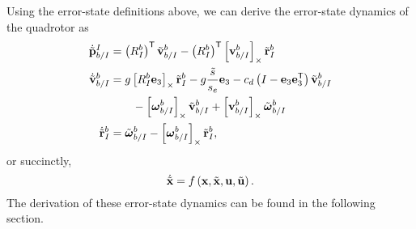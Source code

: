 Using the error-state definitions above, we can derive the error-state dynamics
of the quadrotor as
\begin{align}
        \dot{\tilde{\boldsymbol{\mathrm{p}}}}_{b/I}^{I} &= \left(R_{I}^{b}\right)^{\mathsf{T}}
          \tilde{\boldsymbol{\mathrm{v}}}_{b/I}^{b} - \left(R_{I}^{b}\right)^{\mathsf{T}}
          \left[ \boldsymbol{\mathrm{v}}_{b/I}^{b} \right]_{\times} \tilde{\boldsymbol{\mathrm{r}}}_I^b \nonumber\\
        \dot{\tilde{\boldsymbol{\mathrm{v}}}}_{b/I}^{b} &= g\left[ R_I^b
          \boldsymbol{\mathrm{e}}_3 \right]_{\times} \tilde{\boldsymbol{\mathrm{r}}}_I^b -g\frac{\tilde{s}}{s_e}\boldsymbol{\mathrm{e}}_3
          -c_d \left( I - \boldsymbol{\mathrm{e}}_3 \boldsymbol{\mathrm{e}}_3^{\mathsf{T}} \right)
          \tilde{\boldsymbol{\mathrm{v}}}_{b/I}^b \nonumber \\
                                         & \qquad - \left[ \boldsymbol{\mathrm{\omega}}_{b/I}^b \right]_{\times}
          \tilde{\boldsymbol{\mathrm{v}}}_{b/I}^b + \left[ \boldsymbol{\mathrm{v}}_{b/I}^b \right]_{\times}
          \tilde{\boldsymbol{\mathrm{\omega}}}_{b/I}^b \nonumber \\
          \dot{\tilde{\boldsymbol{\mathrm{r}}}}_{I}^{b} &= \tilde{\boldsymbol{\mathrm{\omega}}}_{b/I}^{b} -
        \left[ \boldsymbol{\mathrm{\omega}}_{b/I}^{b}  \right]_{\times} \tilde{\boldsymbol{\mathrm{r}}}_I^b,
	\label{eq:error_state_dynamics}
\end{align}
or succinctly,
\begin{equation}
  \dot{\tilde{\boldsymbol{\mathrm{x}}}} = f\left(\boldsymbol{\mathrm{x}}, \tilde{\boldsymbol{\mathrm{x}}}, \boldsymbol{\mathrm{u}}, \tilde{\boldsymbol{\mathrm{u}}}\right).
\end{equation}
The derivation of these error-state dynamics can be found in the following
section.


